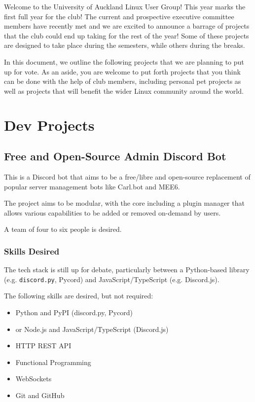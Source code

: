 \documentclass[11pt,fleqn]{article}
\begin{document}
\newpage

Welcome to the University of Auckland Linux User Group!  This year marks the first full year for the club!  The current and prospective executive committee members have recently met and we are excited to announce a barrage of projects that the club could end up taking for the rest of the year!  Some of these projects are designed to take place during the semesters, while others during the breaks.

In this document, we outline the following projects that we are planning to put up for vote.  As an aside, you are welcome to put forth projects that you think can be done with the help of club members, including personal pet projects as well as projects that will benefit the wider Linux community around the world.

\tableofcontents

\newpage

\section{Dev Projects}

\subsection{Free and Open-Source Admin Discord Bot}

This is a Discord bot that aims to be a free/libre and open-source replacement of popular server management bots like Carl.bot and MEE6.

The project aims to be modular, with the core including a plugin manager that allows various capabilities to be added or removed on-demand by users.

A team of four to six people is desired.

\subsubsection*{Skills Desired}

The tech stack is still up for debate, particularly between a Python-based library (e.g. \texttt{discord.py}, Pycord) and JavaScript/TypeScript (e.g. Discord.js).

The following skills are desired, but not required:

\begin{itemize}
    \item Python and PyPI (discord.py, Pycord)
    \item or Node.js and JavaScript/TypeScript (Discord.js)
    \item HTTP REST API
    \item Functional Programming
    \item WebSockets
    \item Git and GitHub
\end{itemize}
\end{document}
